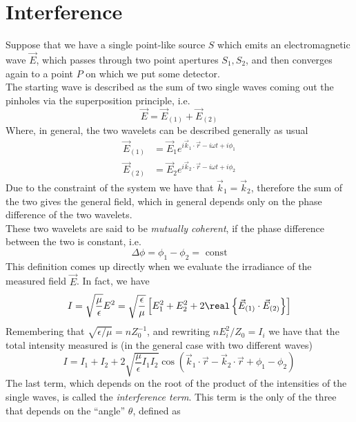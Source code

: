 \documentclass[../electromagnetism.tex]{subfiles}
\begin{document}
\section{Interference}
Suppose that we have a single point-like source $S$ which emits an electromagnetic wave $\vec{E}$, which passes through two point apertures $S_1, S_2$, and then converges again to a point $P$ on which we put some detector.\\
The starting wave is described as the sum of two single waves coming out the pinholes via the superposition principle, i.e.
\begin{equation*}
	\vec{E}=\vec{E}_{(1)}+\vec{E}_{(2)}
\end{equation*}
Where, in general, the two wavelets can be described generally as usual
\begin{equation}
	\begin{aligned}
		\vec{E}_{(1)}&= \vec{E}_1e^{i\vec{k}_1\cdot\vec{r}-i\omega t+i\phi_1}\\
		\vec{E}_{(2)}&= \vec{E}_2e^{i\vec{k}_2\cdot\vec{r}-i\omega t+i\phi_2}
	\end{aligned}
	\label{eq:afterpin.int}
\end{equation}
Due to the constraint of the system we have that $\vec{k}_1=\vec{k}_2$, therefore the sum of the two gives the general field, which in general depends only on the phase difference of the two wavelets.\\
These two wavelets are said to be \textit{mutually coherent}, if the phase difference between the two is constant, i.e.
\begin{equation}
	\Delta\phi=\phi_1-\phi_2=\text{ const}
	\label{eq:coherencedef.int}
\end{equation}
This definition comes up directly when we evaluate the irradiance of the measured field $\vec{E}$. In fact, we have
\begin{equation*}
	I=\sqrt{\frac{\mu}{\epsilon}}E^2=\sqrt{\frac{\epsilon}{\mu}}\left[ E_1^2+E_2^2+2\real\left\{ \vec{E}_{(1)}\cdot\vec{E}_{(2)} \right\} \right]
\end{equation*}
Remembering that $\sqrt{\epsilon/\mu}=nZ_0^{-1}$, and rewriting $nE_i^2/Z_0=I_i$ we have that the total intensity measured is (in the general case with two different waves)
\begin{equation}
	I=I_1+I_2+2\sqrt{\frac{\mu}{\epsilon}I_1I_2}\cos\left( \vec{k}_1\cdot\vec{r}-\vec{k}_2\cdot\vec{r}+\phi_1-\phi_2 \right)
	\label{eq:intwavesI.int}
\end{equation}
The last term, which depends on the root of the product of the intensities of the single waves, is called the \textit{interference term}. This term is the only of the three that depends on the ``angle'' $\theta$, defined as
\end{document}
